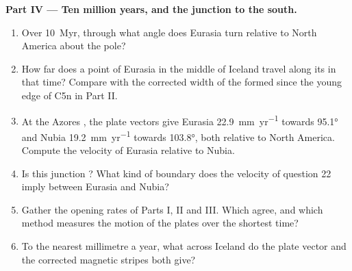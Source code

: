 \begin{problem}
\noindent\textbf{Part IV --- Ten million years, and the junction to the south.}
\begin{enumerate}[resume]
  \item Over \qty{10}{Myr}, through what angle does Eurasia turn relative to
        North America about the pole?
  \item How far does a point of Eurasia in the middle of Iceland travel along
        its  in that time? Compare with the corrected width of the
         formed since the young edge of C5n in Part II.
  \item At the Azores , the plate vectors give Eurasia
        \qty{22.9}{mm.yr^{-1}} towards \ang{95.1} and Nubia
        \qty{19.2}{mm.yr^{-1}} towards \ang{103.8}, both relative to North
        America. Compute the velocity of Eurasia relative to Nubia.
  \item Is this junction ? What kind of boundary does the velocity of
        question 22 imply between Eurasia and Nubia?
  \item Gather the opening rates of Parts I, II and III. Which agree, and
        which method measures the motion of the plates over the shortest time?
  \item To the nearest millimetre a year, what  across
        Iceland do the plate vector and the corrected magnetic stripes both
        give?
\end{enumerate}
\end{problem}
